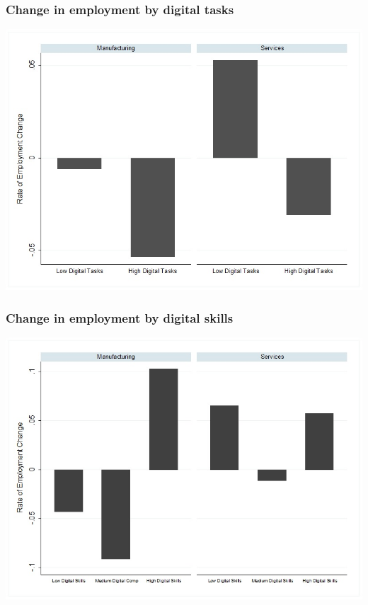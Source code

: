 \documentclass[10pt,xcolor={usenames,dvipsnames}]{beamer}
\begin{document}
\begin{frame}
\frametitle{Change in employment by digital tasks}
\centering
\includegraphics[width=\linewidth,height=0.8\textheight,keepaspectratio]{Figures/8_employment_digital_tasks.jpg}
\end{frame}

\begin{frame}
\frametitle{Change in employment by digital skills}
\centering
\includegraphics[width=\linewidth,height=0.8\textheight,keepaspectratio]{Figures/9_employment_digital_skills.jpg}
\end{frame}
\end{document}
